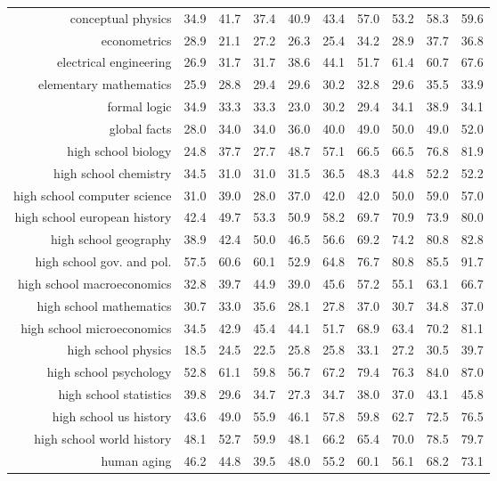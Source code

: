 \documentclass[10pt]{article} \usepackage[preprint]{tmlr}
\begin{document}
\begin{table*}
{\begin{tabular}{r ccc ccc ccc}
conceptual physics	&	34.9	&	41.7	&	37.4	&	40.9	&	43.4	&	57.0	&	53.2	&	58.3	&	59.6	\\
econometrics	&	28.9	&	21.1	&	27.2	&	26.3	&	25.4	&	34.2	&	28.9	&	37.7	&	36.8	\\
electrical engineering	&	26.9	&	31.7	&	31.7	&	38.6	&	44.1	&	51.7	&	61.4	&	60.7	&	67.6	\\
elementary mathematics	&	25.9	&	28.8	&	29.4	&	29.6	&	30.2	&	32.8	&	29.6	&	35.5	&	33.9	\\
formal logic	&	34.9	&	33.3	&	33.3	&	23.0	&	30.2	&	29.4	&	34.1	&	38.9	&	34.1	\\
global facts	&	28.0	&	34.0	&	34.0	&	36.0	&	40.0	&	49.0	&	50.0	&	49.0	&	52.0	\\
high school biology	&	24.8	&	37.7	&	27.7	&	48.7	&	57.1	&	66.5	&	66.5	&	76.8	&	81.9	\\
high school chemistry	&	34.5	&	31.0	&	31.0	&	31.5	&	36.5	&	48.3	&	44.8	&	52.2	&	52.2	\\
high school computer science	&	31.0	&	39.0	&	28.0	&	37.0	&	42.0	&	42.0	&	50.0	&	59.0	&	57.0	\\
high school european history	&	42.4	&	49.7	&	53.3	&	50.9	&	58.2	&	69.7	&	70.9	&	73.9	&	80.0	\\
high school geography	&	38.9	&	42.4	&	50.0	&	46.5	&	56.6	&	69.2	&	74.2	&	80.8	&	82.8	\\
high school gov. and pol.	&	57.5	&	60.6	&	60.1	&	52.9	&	64.8	&	76.7	&	80.8	&	85.5	&	91.7	\\
high school macroeconomics	&	32.8	&	39.7	&	44.9	&	39.0	&	45.6	&	57.2	&	55.1	&	63.1	&	66.7	\\
high school mathematics	&	30.7	&	33.0	&	35.6	&	28.1	&	27.8	&	37.0	&	30.7	&	34.8	&	37.0	\\
high school microeconomics	&	34.5	&	42.9	&	45.4	&	44.1	&	51.7	&	68.9	&	63.4	&	70.2	&	81.1	\\
high school physics	&	18.5	&	24.5	&	22.5	&	25.8	&	25.8	&	33.1	&	27.2	&	30.5	&	39.7	\\
high school psychology	&	52.8	&	61.1	&	59.8	&	56.7	&	67.2	&	79.4	&	76.3	&	84.0	&	87.0	\\
high school statistics	&	39.8	&	29.6	&	34.7	&	27.3	&	34.7	&	38.0	&	37.0	&	43.1	&	45.8	\\
high school us history	&	43.6	&	49.0	&	55.9	&	46.1	&	57.8	&	59.8	&	62.7	&	72.5	&	76.5	\\
high school world history	&	48.1	&	52.7	&	59.9	&	48.1	&	66.2	&	65.4	&	70.0	&	78.5	&	79.7	\\
human aging	&	46.2	&	44.8	&	39.5	&	48.0	&	55.2	&	60.1	&	56.1	&	68.2	&	73.1	\\

\end{tabular}}
\end{table*}
\end{document}

